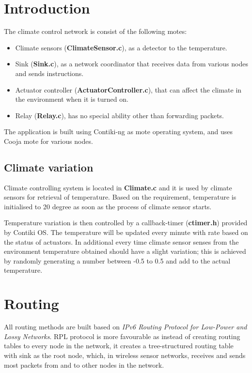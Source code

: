 \documentclass[12pt, oneside, a4paper]{article}
\begin{document}
    \normalsize
    \flushleft

    \section{Introduction}

    The climate control network is consist of the following motes:

    \begin{itemize}[label=\(\square\)]
        \item Climate sensors (\textbf{ClimateSensor.c}), as a detector to the temperature.
        \item Sink (\textbf{Sink.c}), as a network coordinator that receives data from various nodes and sends instructions.
        \item Actuator controller (\textbf{ActuatorController.c}), that can affect the climate in the environment when it is turned on.
        \item Relay (\textbf{Relay.c}), has no special ability other than forwarding packets.
    \end{itemize}

    The application is built using Contiki-ng as mote operating system, and uses Cooja mote for various nodes.

    \subsection{Climate variation}

    Climate controlling system is located in \textbf{Climate.c} and it is used by climate sensors for retrieval of temperature. Based on the requirement, temperature is initialised to 20 degree as soon as the process of climate sensor starts. 
    
    Temperature variation is then controlled by a callback-timer (\textbf{ctimer.h}) provided by Contiki OS. The temperature will be updated every minute with rate based on the status of actuators. In additional every time climate sensor senses from the environment temperature obtained should have a slight variation; this is achieved by randomly generating a number between -0.5 to 0.5 and add to the actual temperature.
    
    \section{Routing}

    All routing methods are built based on \textit{IPv6 Routing Protocol for Low-Power and Lossy Networks}. RPL protocol is more favourable as instead of creating routing tables to every node in the network, it creates a tree-structured routing table with sink as the root node, which, in wireless sensor networks, receives and sends most packets from and to other nodes in the network.
\end{document}
